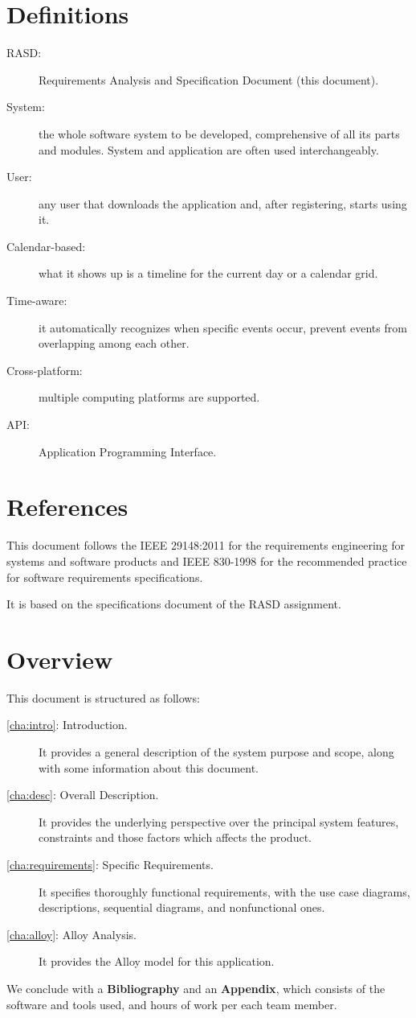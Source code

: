 \section{Definitions}
\label{sec:defs}
\begin{description}
\item[RASD:] Requirements Analysis and Specification Document (this document).
\item[System:] the whole software system to be developed, comprehensive of all its parts and modules. System and application are often used interchangeably. 
\item[User:] any user that downloads the application and, after registering, starts using it.
\item[Calendar-based:] what it shows up is a timeline for the current day or a calendar grid. 
\item[Time-aware:] it automatically recognizes when specific events occur, prevent events from overlapping among each other.
\item[Cross-platform:] multiple computing platforms are supported.
\item[API:] Application Programming Interface.
\end{description}

\section{References}
\label{sec:refer}

This document follows the IEEE 29148:2011\cite{ieee-29148} for the requirements engineering for systems and software products and IEEE 830-1998\cite{ieee-830} for the recommended practice for software requirements specifications.

It is based on the specifications document of the RASD assignment\cite{assignment}.

\section{Overview}
\label{sec:overview}

This document is structured as follows:
\begin{description}
\item[\autoref{cha:intro}: Introduction.] It provides a general description of the system purpose and scope, along with some information about this document.
\item[\autoref{cha:desc}: Overall Description.] It provides the underlying perspective over the principal system features, constraints and those factors which affects the product.
\item[\autoref{cha:requirements}: Specific Requirements.] It specifies thoroughly functional requirements, with the use case diagrams, descriptions, sequential diagrams, and nonfunctional ones.
\item[\autoref{cha:alloy}: Alloy Analysis.] It provides the Alloy\cite{alloy} model for this application.
\end{description}
We conclude with a \textbf{Bibliography} and an \textbf{Appendix}, which consists of the software and tools used, and hours of work per each team member.